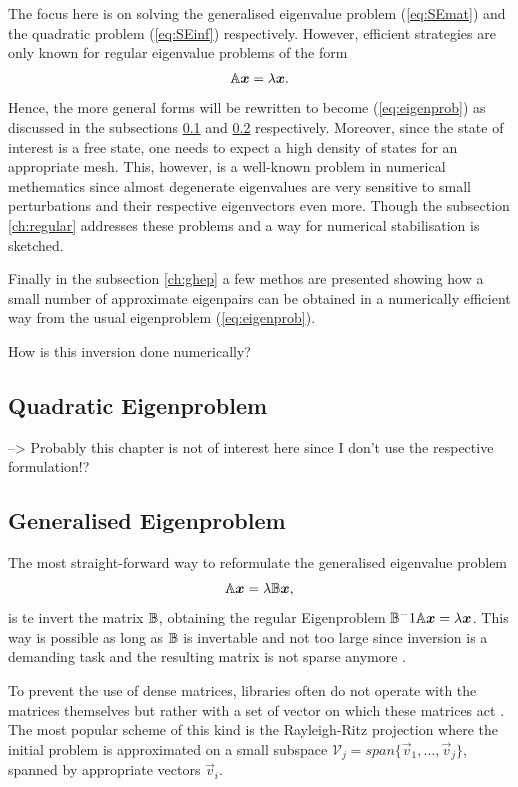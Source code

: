 The focus here is on solving the generalised eigenvalue problem (\ref{eq:SEmat}) and the quadratic problem (\ref{eq:SEinf}) respectively.
However, efficient strategies are only known for regular eigenvalue problems of the form 
\begin{equation} \label{eq:eigenprob}
\mathbb{A}\bm{x}=\lambda\bm{x}.
\end{equation}
Hence, the more general forms will be rewritten to become (\ref{eq:eigenprob}) as discussed in the subsections \ref{ch:quadEV} and \ref{ch:GenEV} respectively.
Moreover, since the state of interest is a free state, one needs to expect a high density of states for an appropriate mesh. 
This, however, is a well-known problem in numerical methematics since almost degenerate eigenvalues are very sensitive to small perturbations and their respective eigenvectors even more.
Though the subsection \ref{ch:regular} addresses these problems and a way for numerical stabilisation is sketched.

Finally in the subsection \ref{ch:ghep} a few methos are presented showing how a small number of approximate eigenpairs can be obtained in a numerically efficient way from the usual eigenproblem (\ref{eq:eigenprob}).

How is this inversion done numerically?

\subsection{Quadratic Eigenproblem}
\label{ch:quadEV}
--> Probably this chapter is not of interest here since I don't use the respective formulation!?

\subsection{Generalised Eigenproblem}
\label{ch:GenEV}
The most straight-forward way to reformulate the generalised eigenvalue problem
\begin{equation} \label{eq:Gep}
\mathbb{A}\bm{x}=\lambda\mathbb{B}\bm{x},
\end{equation}
is te invert the matrix $\mathbb{B}$, obtaining the regular Eigenproblem $\mathbb{B}^-1\mathbb{A}\bm{x}=\lambda\bm{x}$.
This way is possible as long as $\mathbb{B}$ is invertable and not too large since inversion is a demanding task and the resulting matrix is not sparse anymore \cite{slepcManual}.

To prevent the use of dense matrices, libraries often do not operate with the matrices themselves but rather with a set of vector on which these matrices act \cite{slepcManual}.
The most popular scheme of this kind is the Rayleigh-Ritz projection where the initial problem is approximated on a small subspace $\mathcal{V}_j=span \{\vec{v}_1,\hdots,\vec{v}_j\}$, spanned by appropriate vectors $\vec{v}_i$.

